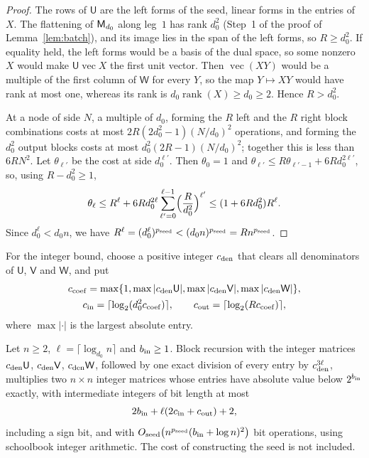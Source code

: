 \begin{proof}
The rows of \(\mathsf U\) are the left forms of the seed, linear forms
in the entries of \(X\). The flattening of \(\mathsf M_{d_0}\) along leg~\(1\)
has rank \(d_0^2\) (Step~1 of the proof of Lemma~\ref{lem:batch}), and
its image lies in the span of the left forms, so \(R\ge d_0^2\). If
equality held, the left forms would be a basis of the dual space, so
some nonzero \(X\) would make \(\mathsf U\operatorname{vec}X\) the first
unit vector. Then \(\operatorname{vec}(XY)\) would be a multiple of the
first column of \(\mathsf W\) for every \(Y\), so the map \(Y\mapsto XY\)
would have rank at most one, whereas its rank is
\(d_0\operatorname{rank}(X)\ge d_0\ge2\). Hence \(R>d_0^2\).

At a node of side \(N\), a multiple of \(d_0\), forming the \(R\) left
and the \(R\) right block combinations costs at most
\(2R(2d_0^2-1)(N/d_0)^2\) operations, and forming the \(d_0^2\) output
blocks costs at most \(d_0^2(2R-1)(N/d_0)^2\); together this is less
than \(6RN^2\). Let \(\theta_{\ell'}\) be the cost at side
\(d_0^{\ell'}\). Then \(\theta_0=1\) and
\(\theta_{\ell'}\le R\theta_{\ell'-1}+6Rd_0^{2\ell'}\), so, using
\(R-d_0^2\ge1\),
\[
 \theta_\ell\le R^\ell+6Rd_0^{2\ell}\sum_{\ell'=0}^{\ell-1}
 \Bigl(\frac R{d_0^2}\Bigr)^{\ell'}
 \le(1+6Rd_0^2)R^\ell.
\]
Since \(d_0^\ell<d_0n\), we have
\(R^\ell=(d_0^\ell)^{p_{\rm seed}}<(d_0n)^{p_{\rm seed}}
=Rn^{p_{\rm seed}}\).
\end{proof}

For the integer bound, choose a positive integer \(c_{\rm den}\) that
clears all denominators of \(\mathsf U\), \(\mathsf V\) and \(\mathsf W\),
and put
\begin{gather*}
 c_{\rm coef}=\max\{1,\max|c_{\rm den}\mathsf U|,\max|c_{\rm den}\mathsf V|,
   \max|c_{\rm den}\mathsf W|\},\\
 c_{\rm in}=\lceil\log_2(d_0^2c_{\rm coef})\rceil,\qquad
 c_{\rm out}=\lceil\log_2(Rc_{\rm coef})\rceil,
\end{gather*}
where \(\max|\cdot|\) is the largest absolute entry.

\begin{proposition}\label{prop:integer-bit-cost}
Let \(n\ge2\), \(\ell=\lceil\log_{d_0}n\rceil\) and \(b_{\rm in}\ge1\). Block
recursion with the integer matrices \(c_{\rm den}\mathsf U\),
\(c_{\rm den}\mathsf V\), \(c_{\rm den}\mathsf W\), followed by one exact
division of every entry by \(c_{\rm den}^{3\ell}\), multiplies two
\(n\times n\) integer matrices whose entries
have absolute value below \(2^{b_{\rm in}}\) exactly, with intermediate
integers of bit length at most
\[
 2b_{\rm in}+\ell(2c_{\rm in}+c_{\rm out})+2,
\]
including a sign bit, and with
\(O_{\rm seed}\bigl(n^{p_{\rm seed}}(b_{\rm in}+\log n)^2\bigr)\) bit
operations, using schoolbook integer arithmetic. The cost of
constructing the seed is not included.
\end{proposition}

